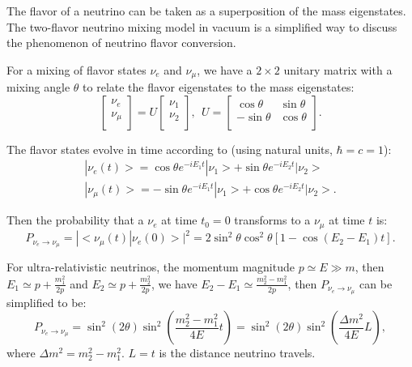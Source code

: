 \documentclass[preprint,12pt]{elsarticle}
\numberwithin{equation}{section}
\begin{document}
The flavor of a neutrino can be taken as a superposition of the mass eigenstates. The two-flavor neutrino mixing model in vacuum is a simplified way to discuss the phenomenon of neutrino flavor conversion.

For a mixing of flavor states $\nu_e$ and $\nu_\mu$, we have a $2\times2$ unitary matrix with a mixing angle $\theta$ to relate the flavor eigenstates to the mass eigenstates\cite{cahn}:
\begin{equation}\label{eq:2flavormatrix}
\begin{bmatrix}
\nu_e\\
\nu_\mu\\
\end{bmatrix}
= U\begin{bmatrix}
\nu_1\\
\nu_2\\
\end{bmatrix}, ~~U=\begin{bmatrix}
\cos\theta &\sin\theta\\
-\sin\theta &\cos\theta\\
\end{bmatrix}.
\end{equation}

The flavor states evolve in time according to (using natural units, $\hbar=c=1$):
\begin{equation}
\begin{aligned}
|\nu_e(t)> = \cos\theta e^{-iE_1t}|\nu_1>+\sin\theta e^{-iE_2t}|\nu_2>
\\
|\nu_\mu(t)> = -\sin\theta e^{-iE_1t}|\nu_1>+\cos\theta e^{-iE_2t}|\nu_2>.
\end{aligned}
\end{equation}

Then the probability that a $\nu_e$ at time $t_0=0$ transforms to a $\nu_\mu$ at time $t$ is:
\begin{equation}
P_{\nu_e\to\nu_\mu} = |<\nu_\mu(t)|\nu_e(0)>|^2= 2\sin^2\theta\cos^2\theta[1-\cos(E_2-E_1)t].
\end{equation}

For ultra-relativistic neutrinos, the momentum magnitude $p\simeq E\gg m$, then $E_1\simeq p+\frac{m^2_1}{2p}$ and $E_2\simeq p+\frac{m^2_2}{2p}$, we have $E_2-E_1\simeq\frac{m_2^2-m_1^2}{2p}$,
then $P_{\nu_e\to\nu_\mu}$ can be simplified to be:
\begin{equation}\label{eq:oscillation}
P_{\nu_e\to\nu_\mu} = \sin^2( 2\theta)\sin^2(\frac{m_2^2-m_1^2}{4E}t)=\sin^2( 2\theta)\sin^2(\frac{\Delta m^2}{4E}L),
\end{equation}
where $\Delta m^2=m_2^2-m_1^2$. $L = t$ is the distance neutrino travels. 
\end{document}
